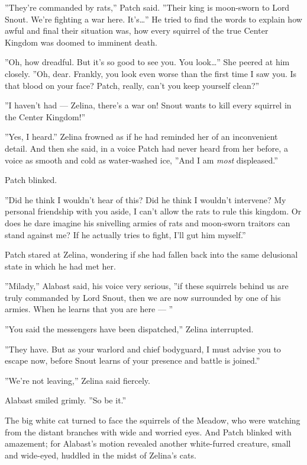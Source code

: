 \documentclass[12pt]{book}
\begin{document}
''They're commanded by rats,'' Patch said. ''Their king is moon-sworn
to Lord Snout. We're fighting a war here. It's\ldots{}'' He tried to
find the words to explain how awful and final their situation was, how
every squirrel of the true Center Kingdom was doomed to imminent
death.

''Oh, how dreadful. But it's so good to see you. You look\ldots{}''
She peered at him closely. ''Oh, dear. Frankly, you look even worse
than the first time I saw you. Is that blood on your face? Patch,
really, can't you keep yourself clean?''

''I haven't had --- Zelina, there's a war on! Snout wants to kill
every squirrel in the Center Kingdom!''

''Yes, I heard.'' Zelina frowned as if he had reminded her of an
inconvenient detail. And then she said, in a voice Patch had never
heard from her before, a voice as smooth and cold as water-washed ice,
''And I am \textit{most} displeased.''

Patch blinked.

''Did he think I wouldn't hear of this? Did he think I wouldn't
intervene? My personal friendship with you aside, I can't allow the
rats to rule this kingdom. Or does he dare imagine his snivelling
armies of rats and moon-sworn traitors can stand against me? If he
actually tries to fight, I'll gut him myself.''

Patch stared at Zelina, wondering if she had fallen back into the same
delusional state in which he had met her.

''Milady,'' Alabast said, his voice very serious, ''if these squirrels
behind us are truly commanded by Lord Snout, then we are now
surrounded by one of his armies. When he learns that you are here ---
''

''You said the messengers have been dispatched,'' Zelina interrupted.

''They have. But as your warlord and chief bodyguard, I must advise
you to escape now, before Snout learns of your presence and battle is
joined.''

''We're not leaving,'' Zelina said fiercely.

Alabast smiled grimly. ''So be it.''

The big white cat turned to face the squirrels of the Meadow, who were
watching from the distant branches with wide and worried eyes. And
Patch blinked with amazement; for Alabast's motion revealed another
white-furred creature, small and wide-eyed, huddled in the midst of
Zelina's cats.
\end{document}
